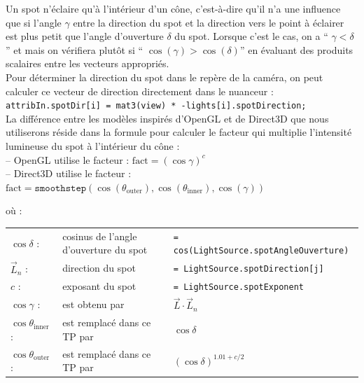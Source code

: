 \documentclass{article}[letterpaper, 11pt]
\begin{document}
Un spot n'éclaire qu'à l'intérieur d'un cône, c'est-à-dire qu'il n'a une influence que si l'angle $\gamma$ entre la direction du spot et la direction vers le point à éclairer est plus petit que l'angle d'ouverture $\delta$ du spot.
Lorsque c'est le cas, on a `` $\gamma < \delta$ '' et mais on vérifiera plutôt si `` $\cos(\gamma) > \cos(\delta)$'' en évaluant des produits scalaires entre les vecteurs appropriés.\vspace*{11pt}
\\
Pour déterminer la direction du spot dans le repère de la caméra, on peut calculer ce vecteur de direction
directement dans le nuanceur :\vspace*{11pt}
\\
\texttt{attribIn.spotDir[i] = mat3(view) * -lights[i].spotDirection;}\vspace*{11pt}
\\
La différence entre les modèles inspirés d'OpenGL et de Direct3D que nous utiliserons réside dans la formule pour calculer le facteur qui multiplie l'intensité lumineuse du spot à l'intérieur du cône :\vspace*{11pt}
\\
-- OpenGL utilise le facteur : $\text{fact} = {(\cos \gamma)}^{c}$\vspace*{11pt}
\\
-- Direct3D utilise le facteur : $\text{fact} = \texttt{smoothstep}(\cos(\theta_{\text{outer}}), \cos(\theta_{\text{inner}}), \cos(\gamma))$

où :\\
\begin{tabular}{lll}
	$\cos \delta$ : & cosinus de l'angle d'ouverture du spot & \texttt{= cos(LightSource.spotAngleOuverture)}\\

	$\vec{L}_n$ : & direction du spot & \texttt{= LightSource.spotDirection[j]}\\

	$c$ : & exposant du spot & \texttt{= LightSource.spotExponent}\\

	$\cos \gamma$ : & est obtenu par & $\vec{L} \cdot \vec{L}_n$ \\

	$\cos \theta_{\text{inner}}$ : & est remplacé dans ce TP par & $\cos \delta$\\

	$\cos \theta_{\text{outer}}$ : & est remplacé dans ce TP par & ${(\cos \delta)}^{1.01 + c/2}$\\

\end{tabular}
\end{document}
